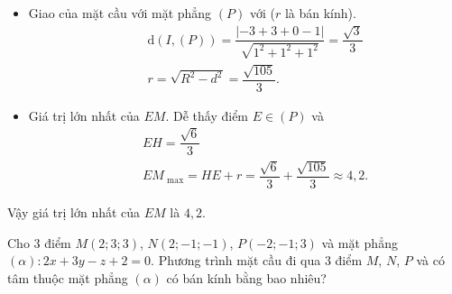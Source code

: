 \begin{bt}
{\begin{itemize}
	Phương trình đường thẳng $d$ đi  qua $I$ và vuông góc với $(P)$ là $\heva{&x=-3+t\\&y=3+t,\, t\in\mathbb{R}\\&z=t.}$\\
	Xét  phương trình $(-3+t)+(3+t)+t-1=0\Leftrightarrow t=\dfrac{1}{3}$.\\
	Vậy $H\left(\dfrac{-8}{3};\dfrac{10}{3};\dfrac{1}{3}\right)$. 
	 \item Giao của mặt cầu với mặt phẳng $(P)$ với ($r$ là bán kính).
	\begin{eqnarray*}
		&& \mathrm{d}(I,(P)) = \dfrac{|-3 + 3 + 0 - 1|}{\sqrt{1^2 + 1^2 + 1^2}} = \dfrac{\sqrt{3}}{3}  \\
		&& r = \sqrt{R^2  - d^2} = \dfrac{\sqrt{105}}{3}.
	\end{eqnarray*}
	\item Giá trị lớn nhất của $EM$. Dễ  thấy điểm $E\in (P)$ và
	\begin{eqnarray*}
		&& EH =  \dfrac{\sqrt{6}}{3} \\
		&& EM_{\text{ max}} = HE  + r =\dfrac{\sqrt{6}}{3}+\dfrac{\sqrt{105}}{3}\approx 4{,}2.
	\end{eqnarray*}
\end{itemize}
Vậy giá  trị lớn nhất của $EM$ là $4{,}2$.
} 
\end{bt}

\begin{bt}%
	Cho $3$ điểm $M(2;3;3)$, $N(2;-1;-1)$, $P(-2;-1;3)$ và mặt  phẳng $(\alpha)\colon 2x+3y-z+2=0$. Phương trình mặt cầu đi qua $3$ điểm $M$, $N$, $P$ và có tâm thuộc mặt phẳng $(\alpha)$ có bán kính bằng bao nhiêu?
\end{bt}

